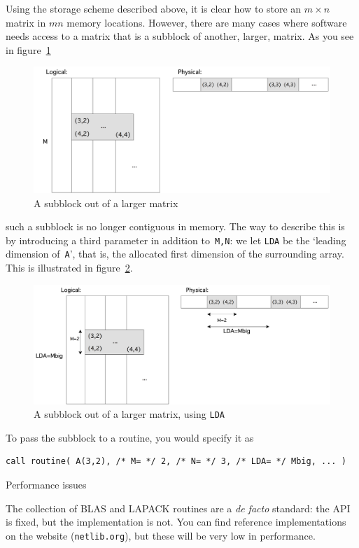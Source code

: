 Using the storage scheme described above, it is clear how to store an
$m\times n$ matrix in $mn$ memory locations. However, there are many
cases where software needs access to a matrix that is a subblock of
another, larger, matrix. As you see in figure~\ref{fig:lda1}
\begin{figure}[ht]
  \includegraphics[scale=.14]{graphics/denselda}
  \caption{A subblock out of a larger matrix}
  \label{fig:lda1}
\end{figure}
such a subblock is no longer contiguous in memory. The way to describe
this is by introducing a third parameter in addition to~{\tt M,N}: we
let {\tt LDA} be the `leading dimension of~{\tt A}', that is, the
allocated first dimension of the surrounding array. This is
illustrated in figure~\ref{fig:lda2}.
\begin{figure}
  \includegraphics[scale=.14]{graphics/denselda2}
  \caption{A subblock out of a larger matrix, using {\tt LDA}}
  \label{fig:lda2}
\end{figure}
To pass the subblock to a routine, you would specify it as
\begin{verbatim}
call routine( A(3,2), /* M= */ 2, /* N= */ 3, /* LDA= */ Mbig, ... )
\end{verbatim}


 {Performance issues}

The collection of BLAS and LAPACK routines are a \emph{de facto}
standard: the \ac{API} is fixed, but the implementation is not.
You can find reference implementations on the
 website (\texttt{netlib.org}), but
these will be very low in performance.

